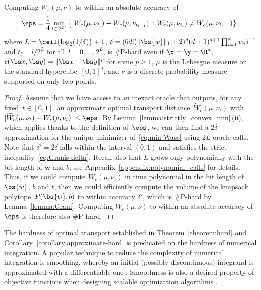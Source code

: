 \documentclass[11pt, a4paper, oneside, reqno]{article}
\begin{document}
	{\color{black} 
	\begin{corollary}
	\label{corollary:approximate-hard}
	Computing $W_c(\mu, \nu)$ to within an absolute accuracy of
	\[
	    \eps =\frac{1}{4} \min\limits_{l\in [ 2^L]} \left\{ |W_c(\mu, \nu_{t_{l}}) - W_c(\mu, \nu_{t_{l-1}})| : W_c(\mu, \nu_{t_{l}}) \neq W_c(\mu, \nu_{t_{l-1}})\right\},
	\]
	where $L = \ceil{\log_2(1/ \delta)} + 1$, $\delta = (6 d!(\|\bs{w}\|_1+2)^d(d+1)^{d+1}\prod_{i = 1}^{d}w_i)^{-1} $ and $t_l = l/ 2^{L}$ for all~$l =0, \ldots, 2^L$, is \#P-hard even if $\x=\y=\R^d$, $c(\bs x, \bs y) = \|\bs x-\bs y\|^{p}$ for some $p\geq 1$, $\mu$ is the Lebesgue measure on the standard hypercube~$[0,1]^d$, and $\nu$ is a discrete probability measure supported on only two points.
	\end{corollary}
	\begin{proof}
		{\color{black} 
		Assume that we have access to an inexact oracle that outputs, for any fixed~$t\in[0,1]$, an approximate optimal transport distance~$\widetilde W_c(\mu, \nu_t)$ with~$|\widetilde W_c(\mu, \nu_t) - W_c(\mu, \nu_t) |\leq \eps$. By Lemma~\ref{lemma:strictly_convex_min}\,(ii), which applies thanks to the definition of~$\eps$, we can then find a $2\delta$-approximation for the unique minimizer of~\eqref{eq:min-Wass} using $2L$ oracle calls. Note that $\delta'=2\delta$ falls within the interval $(0, 1)$ and satisfies the strict inequality~\eqref{eq:Granis-delta}. Recall also that $L$ grows only polynomially with the bit length of $\bm w$ and $b$; see Appendix~\ref{appendix:polynomial_calls} for details. Thus, if we could compute $\widetilde W_c(\mu, \nu_t)$ in time polynomial in the bit length of $\bs{w}$, $b$ and $t$, then we could efficiently compute the volume of the knapsack polytope~$P( \bs{w}, b)$ to within accuracy $\delta'$, which is $\#$P-hard by Lemma~\ref{lemma:Grani}. Computing $W_c(\mu, \nu)$ to within an absolute accuracy of~$\eps$ is therefore also $\#$P-hard.
		}
	\end{proof}
	}
	The hardness of optimal transport established in Theorem~\ref{theorem:hard} {\color{black} and Corollary~\ref{corollary:approximate-hard}} is predicated on the hardness of numerical integration. A popular technique to reduce the complexity of numerical integration is smoothing, whereby an initial (possibly discontinuous) integrand is approximated with a differentiable one \citep{dick2013high}.
	Smoothness is also a desired property of objective functions when designing scalable optimization algorithms \citep{bubeck2015convex}.
\end{document}
